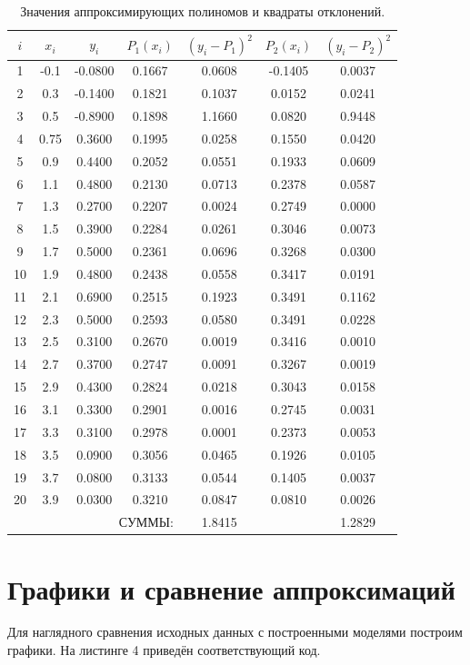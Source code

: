 \begin{table}[h]
\centering
\begin{tabular}{|c|c|c|c|c|c|c|}
\hline
$i$ & $x_i$ & $y_i$ & $P_1(x_i)$ & $(y_i - P_1)^2$ & $P_2(x_i)$ & $(y_i - P_2)^2$ \\
\hline
1 & -0.1 & -0.0800 & 0.1667 & 0.0608 & -0.1405 & 0.0037 \\
2 & 0.3 & -0.1400 & 0.1821 & 0.1037 & 0.0152 & 0.0241 \\
3 & 0.5 & -0.8900 & 0.1898 & 1.1660 & 0.0820 & 0.9448 \\
4 & 0.75 & 0.3600 & 0.1995 & 0.0258 & 0.1550 & 0.0420 \\
5 & 0.9 & 0.4400 & 0.2052 & 0.0551 & 0.1933 & 0.0609 \\
6 & 1.1 & 0.4800 & 0.2130 & 0.0713 & 0.2378 & 0.0587 \\
7 & 1.3 & 0.2700 & 0.2207 & 0.0024 & 0.2749 & 0.0000 \\
8 & 1.5 & 0.3900 & 0.2284 & 0.0261 & 0.3046 & 0.0073 \\
9 & 1.7 & 0.5000 & 0.2361 & 0.0696 & 0.3268 & 0.0300 \\
10 & 1.9 & 0.4800 & 0.2438 & 0.0558 & 0.3417 & 0.0191 \\
11 & 2.1 & 0.6900 & 0.2515 & 0.1923 & 0.3491 & 0.1162 \\
12 & 2.3 & 0.5000 & 0.2593 & 0.0580 & 0.3491 & 0.0228 \\
13 & 2.5 & 0.3100 & 0.2670 & 0.0019 & 0.3416 & 0.0010 \\
14 & 2.7 & 0.3700 & 0.2747 & 0.0091 & 0.3267 & 0.0019 \\
15 & 2.9 & 0.4300 & 0.2824 & 0.0218 & 0.3043 & 0.0158 \\
16 & 3.1 & 0.3300 & 0.2901 & 0.0016 & 0.2745 & 0.0031 \\
17 & 3.3 & 0.3100 & 0.2978 & 0.0001 & 0.2373 & 0.0053 \\
18 & 3.5 & 0.0900 & 0.3056 & 0.0465 & 0.1926 & 0.0105 \\
19 & 3.7 & 0.0800 & 0.3133 & 0.0544 & 0.1405 & 0.0037 \\
20 & 3.9 & 0.0300 & 0.3210 & 0.0847 & 0.0810 & 0.0026 \\
\hline
\multicolumn{4}{|r|}{СУММЫ:} & 1.8415 & & 1.2829 \\
\hline
\end{tabular}
\caption{Значения аппроксимирующих полиномов и квадраты отклонений.}
\end{table}

\newpage
\section{Графики и сравнение аппроксимаций}
Для наглядного сравнения исходных данных с построенными моделями построим графики. На листинге 4 приведён соответствующий код.

